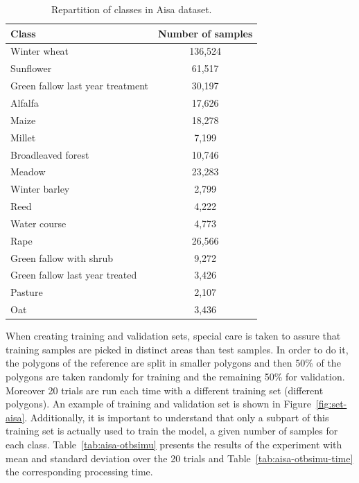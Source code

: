 \documentclass[journal,peerreview,onecolumn]{IEEEtran}
\begin{document}
    \begin{table}[!t]
        \centering
        \caption{Repartition of classes in Aisa dataset.\label{tab:aisa}}
        \begin{tabular}[b]{lc}\hline
          Class & Number of samples \\ \hline
          Winter wheat & 136,524 \\
          Sunflower & 61,517 \\
          Green fallow last year treatment & 30,197 \\
          Alfalfa & 17,626 \\
          Maize & 18,278 \\
          Millet & 7,199 \\
          Broadleaved forest & 10,746 \\
          Meadow & 23,283 \\
          Winter barley & 2,799 \\
          Reed & 4,222 \\
          Water course & 4,773 \\
          Rape & 26,566 \\
          Green fallow with shrub & 9,272 \\
          Green fallow last year treated & 3,426 \\
          Pasture & 2,107 \\
          Oat & 3,436 \\ \hline
        \end{tabular}
    \end{table}

    When creating training and validation sets, special care is taken to assure that training samples are picked in distinct areas than test samples. In order to do it, the polygons of the reference are split in smaller polygons and then 50\% of the polygons are taken randomly for training and the remaining 50\% for validation. Moreover 20 trials are run each time with a different training set (different polygons). An example of training and validation set is shown in Figure~\ref{fig:set-aisa}. Additionally, it is important to understand that only a subpart of this training set is actually used to train the model, a given number of samples for each class. Table~\ref{tab:aisa-otbsimu} presents the results of the experiment with mean and standard deviation over the 20 trials and Table~\ref{tab:aisa-otbsimu-time} the corresponding processing time.
\end{document}
